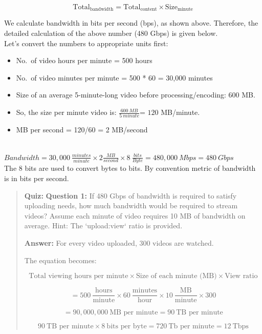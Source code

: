 \[
\text{Total}_\text{{bandwidth}} = \text{Total}_\text{{content}} \times \text{Size}_\text{{minute}}
\]

We calculate bandwidth in bits per second (bps), as shown above. Therefore, the detailed calculation of the above number (480 Gbps) is given below.
\\
Let's convert the numbers to appropriate units first:

\begin{itemize}
\item
No.~of video hours per minute = 500 hours
\item
No.~of video minutes per minute = 500 * 60 = 30,000 minutes
\item
Size of an average 5-minute-long video before processing/encoding: 600 MB.
\item
So, the size per minute video is: \(\frac{600\ MB} {5 \ minute}\)= \(120\) MB/minute.
\item
MB per second = 120/60 = 2 MB/second
\end{itemize}
\\
\(Bandwidth = 30,000\ \frac{minutes}{minute}\times 2 \frac{MB}{second} \times 8\ \frac{ bits}{Byte} = 480,000\ Mbps = 480 \ Gbps\)
\\
The 8 bits are used to convert bytes to bits. By convention metric of bandwidth is in bits per second.

\begin{quote}
\textbf{Quiz:}
\textbf{Question 1:} If 480 Gbps of bandwidth is required to satisfy uploading needs, how much bandwidth would be required to stream videos?  
Assume each minute of video requires 10 MB of bandwidth on average.  
Hint: The `upload:view` ratio is provided.

\textbf{Answer:} For every video uploaded, 300 videos are watched.

The equation becomes:

\[
\text{Total viewing hours per minute}
\times \text{Size of each minute (MB)}
\times \text{View ratio}
\]

\[
= 500\ \frac{\text{hours}}{\text{minute}}
\times 60\ \frac{\text{minutes}}{\text{hour}}
\times 10\ \frac{\text{MB}}{\text{minute}}
\times 300
\]

\[
= 90{,}000{,}000\ \text{MB per minute}
= 90\ \text{TB per minute}
\]

\[
90\ \text{TB per minute} \times 8\ \text{bits per byte}
= 720\ \text{Tb per minute}
= 12\ \text{Tbps}
\]

\end{quote}

